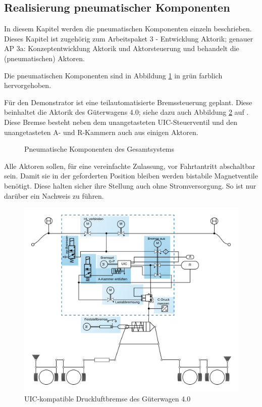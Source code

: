 \subsection{Realisierung pneumatischer Komponenten}
In diesem Kapitel werden die pneumatischen Komponenten einzeln beschrieben. Dieses Kapitel ist zugehörig zum Arbeitspaket 3 - Entwicklung Aktorik; genauer AP 3a: Konzeptentwicklung Aktorik und Aktorsteuerung und behandelt die (pneumatischen) Aktoren.\par
Die pneumatischen Komponenten sind in Abbildung \ref{fig:pKomp} in grün farblich hervorgehoben.\par
Für den Demonstrator ist eine teilautomatisierte Bremssteuerung geplant. Diese beinhaltet die Aktorik des Güterwagens 4.0; siehe dazu auch Abbildung \ref{fig:UIC-Bremse} auf \pageref{fig:UIC-Bremse}. Diese Bremse besteht neben dem unangetasteten UIC-Steuerventil und den unangetasteten A- und R-Kammern auch aus einigen Aktoren.\par
\begin{figure}[hbt]
    \centering
    
    \caption{Pneumatische Komponenten des Gesamtsystems}
    \label{fig:pKomp}
\end{figure}
Alle Aktoren sollen, für eine vereinfachte Zulassung, vor Fahrtantritt abschaltbar sein. Damit sie in der geforderten Position bleiben werden bistabile Magnetventile benötigt. Diese halten sicher ihre Stellung auch ohne Stromversorgung. So ist nur darüber ein Nachweis zu führen.
\begin{figure}
    \centering%
    \includegraphics[width=10cm%
    ]{Bilder/Abb3_Druckluftbremse.png}
    \caption{UIC-kompatible Druckluftbremse des Güterwagen 4.0 \cite{ETR_2}}
    \label{fig:UIC-Bremse}
\end{figure}

